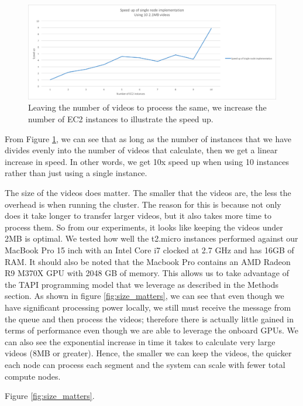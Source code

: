 \begin{figure}[h]
  \label{fig:speed_up}
  \centering
  \includegraphics[width=\textwidth]{figures/speed_up}
  \caption{Leaving the number of videos to process the same, we increase the
  number of EC2 instances to illustrate the speed up.}
\end{figure}

From Figure \ref{fig:speed_up}, we can see that as long as the number of instances
that we have divides evenly into the number of videos that calculate, then we
get a linear increase in speed. In other words, we get 10x speed up when using
10 instances rather than just using a single instance.

The size of the videos does matter. The smaller that the videos are, the less
the overhead is when running the cluster. The reason for this is because not only
does it take longer to transfer larger videos, but it also takes more time to process
them. So from our experiments, it looks like keeping the videos under 2MB is optimal.
We tested how well the t2.micro instances performed against our MacBook Pro 15 inch
with an Intel Core i7 clocked at 2.7 GHz and has 16GB of RAM. It should also be
noted that the Macbook Pro contains an AMD Radeon R9 M370X GPU with 2048 GB of
memory. This allows us to take advantage of the TAPI programming model that
we leverage as described in the Methods section.  As shown in figure \ref{fig:size_matters},
we can see that even though we have significant processing power locally, we still
must receive the message from the queue and then process the videos; therefore
there is actually little gained in terms of performance even though we are able
to leverage the onboard GPUs. We can also see the exponential increase in time
it takes to calculate very large videos (8MB or greater). Hence, the smaller
we can keep the videos, the quicker each node can process each segment and the
system can scale with fewer total compute nodes.

Figure \ref{fig:size_matters}.

